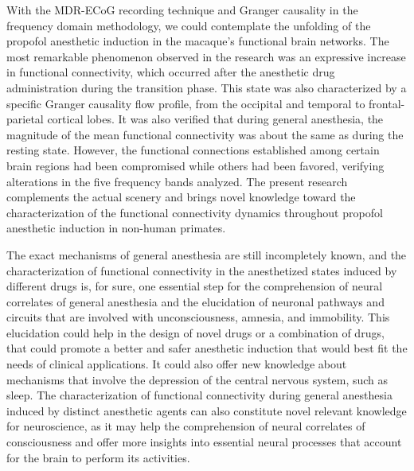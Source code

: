 \documentclass[twoside]{article}
\begin{document}
\begin{multicols}{2}
With the MDR-ECoG recording technique and Granger causality in the frequency domain methodology, we could contemplate the unfolding of the propofol anesthetic induction in the macaque's functional brain networks. The most remarkable phenomenon observed in the research was an expressive increase in functional connectivity, which occurred after the anesthetic drug administration during the transition phase. This state was also characterized by a specific Granger causality flow profile, from the occipital and temporal to frontal-parietal cortical lobes. It was also verified that during general anesthesia, the magnitude of the mean functional connectivity was about the same as during the resting state. However, the functional connections established among certain brain regions had been compromised while others had been favored, verifying alterations in the five frequency bands analyzed. The present research complements the actual scenery and brings novel knowledge toward the characterization of the functional connectivity dynamics throughout propofol anesthetic induction in non-human primates.

The exact mechanisms of general anesthesia are still incompletely known, and the characterization of functional connectivity in the anesthetized states induced by different drugs is, for sure, one essential step for the comprehension of neural correlates of general anesthesia and the elucidation of neuronal pathways and circuits that are involved with unconsciousness, amnesia, and immobility. This elucidation could help in the design of novel drugs or a combination of drugs, that could promote a better and safer anesthetic induction that would best fit the needs of clinical applications. It could also offer new knowledge about mechanisms that involve the depression of the central nervous system, such as sleep. The characterization of functional connectivity during general anesthesia induced by distinct anesthetic agents can also constitute novel relevant knowledge for neuroscience, as it may help the comprehension of neural correlates of consciousness and offer more insights into essential neural processes that account for the brain to perform its activities.


\enlargethispage{5\baselineskip}



\end{multicols}
\end{document}
